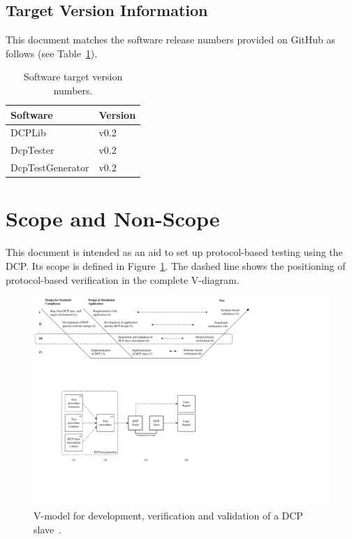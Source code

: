 \documentclass[a4paper]{scrartcl}
\theoremstyle{definition}
\begin{document}
\subsection{Target Version Information}

This document matches the software release numbers provided on GitHub as follows (see Table~\ref{tab:target_version_information}).

\begin{table}[H]
\label{tab:target_version_information}
	\centering
		\begin{tabular}{ll}
			Software	& Version	\\ \hline
			DCPLib	& v0.2 \\
			DcpTester & v0.2 \\
			DcpTestGenerator	& v0.2 \\
		\end{tabular}
		\caption{Software target version numbers.}
\end{table}



\section{Scope and Non-Scope}
\label{sec:scope}
This document is intended as an aid to set up protocol-based testing using the DCP.
Its scope is defined in Figure~\ref{fig:overall_process}.
The dashed line shows the positioning of protocol-based verification in the complete V-diagram.

	\begin{figure}[H]
	\centering %
 		\includegraphics[width=1.0\textwidth, clip=true,trim=0cm 20.5cm 11.5cm 0cm]{resources/overall_process.pdf}
	\caption{V-model for development, verification and validation of a DCP slave~\cite{Krammer2020}.}
	\label{fig:overall_process}
\end{figure}
\end{document}
